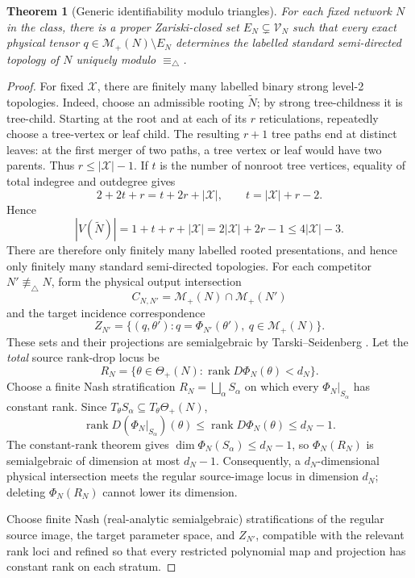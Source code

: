 \documentclass[11pt]{article}
\newtheorem{theorem}{Theorem}[section]
\theoremstyle{remark}
\newcommand{\X}{\mathcal X}
\newcommand{\M}{\mathcal M}
\newcommand{\V}{\mathcal V}
\newcommand{\trianglerel}{\equiv_\triangle}
\newcommand{\1}{\mathbf 1}
\begin{document}
\begin{theorem}[Generic identifiability modulo triangles]
\label{thm:genericity}
For each fixed network \(N\) in the class, there is a proper Zariski-closed
set \(E_N\subsetneq\V_N\) such that every exact physical tensor
\(q\in\M_+(N)\setminus E_N\) determines the labelled standard semi-directed
topology of \(N\) uniquely modulo \(\trianglerel\).
\end{theorem}

\begin{proof}
For fixed \(\X\), there are finitely many labelled binary strong level-2
topologies.  Indeed, choose an admissible rooting \(\widetilde N\); by strong
tree-childness it is tree-child.  Starting at the root and at each of its
\(r\) reticulations, repeatedly choose a tree-vertex or leaf child.  The
resulting \(r+1\) tree paths end at distinct leaves: at the first merger of
two paths, a tree vertex or leaf would have two parents.  Thus
\(r\le|\X|-1\).  If \(t\) is the number of nonroot tree vertices, equality of
total indegree and outdegree gives
\[
 2+2t+r=t+2r+|\X|,\qquad t=|\X|+r-2.
\]
Hence
\[
 |V(\widetilde N)|=1+t+r+|\X|
 =2|\X|+2r-1\le4|\X|-3.
\]
There are therefore only finitely many labelled rooted presentations, and
hence only finitely many standard semi-directed topologies.  For each
competitor \(N'\not\trianglerel N\), form the physical
output intersection
\[
 C_{N,N'}=\M_+(N)\cap\M_+(N')
\]
and the target incidence correspondence
\[
 Z_{N'}=\{(q,\theta'):
 q=\Phi_{N'}(\theta'),\ q\in\M_+(N)\}.
\]
These sets and their projections are semialgebraic by Tarski--Seidenberg
\cite[Theorem~2.2.1]{BochnakCosteRoy1998}.  Let the \emph{total} source
rank-drop locus be
\[
 R_N=\{\theta\in\Theta_+(N):
       \operatorname{rank}D\Phi_N(\theta)<d_N\}.
\]
Choose a finite Nash stratification
\(R_N=\bigsqcup_\alpha S_\alpha\) on which every
\(\Phi_N|_{S_\alpha}\) has constant rank.  Since
\(T_\theta S_\alpha\subseteq T_\theta\Theta_+(N)\),
\[
 \operatorname{rank}D(\Phi_N|_{S_\alpha})(\theta)
 \le \operatorname{rank}D\Phi_N(\theta)\le d_N-1.
\]
The constant-rank theorem gives
\(\dim\Phi_N(S_\alpha)\le d_N-1\), so
\(\Phi_N(R_N)\) is semialgebraic of dimension at most \(d_N-1\).
Consequently, a \(d_N\)-dimensional physical intersection meets the regular
source-image locus in dimension \(d_N\); deleting \(\Phi_N(R_N)\) cannot lower
its dimension.

Choose finite Nash
(real-analytic semialgebraic) stratifications of the regular source image,
the target parameter space, and \(Z_{N'}\), compatible with the relevant
rank loci and refined so that every restricted polynomial map and projection
has constant rank on each stratum.


\end{proof}
\end{document}
